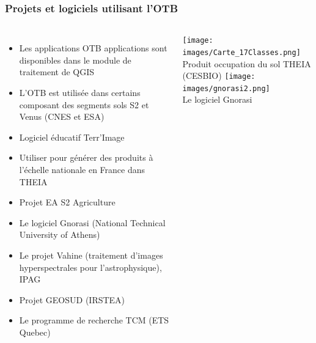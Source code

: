 \documentclass[8pt]{beamer}
\begin{document}
\begin{frame}
\frametitle{Projets et logiciels utilisant l'OTB}
\begin{columns}
  \begin{itemize}
    \item Les applications OTB applications sont disponibles dans le module de traitement de QGIS
    \item L'OTB est utilisée dans certains composant des segments sols S2 et
      Venus (CNES et ESA)
    \item Logiciel éducatif Terr'Image
    \item Utiliser pour générer des produits à l'échelle nationale en France
      dans THEIA
    \item Projet EA S2 Agriculture
    \item Le logiciel Gnorasi (National Technical University of Athens)
    \item Le projet Vahine (traitement d'images hyperspectrales pour l'astrophysique), IPAG
    \item Projet GEOSUD (IRSTEA)
    \item Le programme de recherche TCM (ETS Quebec)
  \end{itemize}
\begin{center}
  \texttt{[image: images/Carte\_17Classes.png]}\\
  \tiny{Produit occupation du sol THEIA (CESBIO)}
  \texttt{[image: images/gnorasi2.png]}\\
  \tiny{Le logiciel Gnorasi}
\end{center}
\end{columns}
\end{frame}
\end{document}
